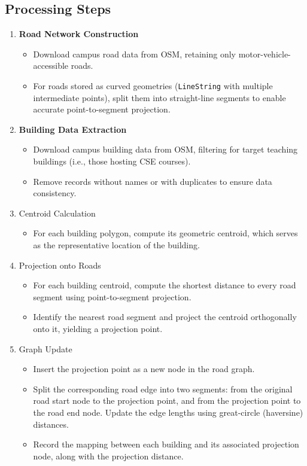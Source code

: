 \documentclass[fleqn,10pt]{olplainarticle}
\begin{document}
\subsection*{Processing Steps}
\begin{enumerate}
    \item \textbf{Road Network Construction}
    \begin{itemize}
        \item Download campus road data from OSM, retaining only motor-vehicle-accessible roads.
        \item For roads stored as curved geometries (\texttt{LineString} with multiple intermediate points), split them into straight-line segments to enable accurate point-to-segment projection.
    \end{itemize}

    \item \textbf{Building Data Extraction}
    \begin{itemize}
        \item Download campus building data from OSM, filtering for target teaching buildings (i.e., those hosting CSE courses).
        \item Remove records without names or with duplicates to ensure data consistency.
    \end{itemize}

    \item Centroid Calculation
    \begin{itemize}
        \item For each building polygon, compute its geometric centroid, which serves as the representative location of the building.
    \end{itemize}
    
    \item Projection onto Roads
    \begin{itemize}
        \item For each building centroid, compute the shortest distance to every road segment using point-to-segment projection.
        \item Identify the nearest road segment and project the centroid orthogonally onto it, yielding a projection point.
    \end{itemize}
    
    \item Graph Update
    \begin{itemize}
        \item Insert the projection point as a new node in the road graph.
        \item Split the corresponding road edge into two segments: from the original road start node to the projection point, and from the projection point to the road end node. Update the edge lengths using great-circle (haversine) distances.
        \item Record the mapping between each building and its associated projection node, along with the projection distance.
    \end{itemize}
    

\end{enumerate}
\end{document}
